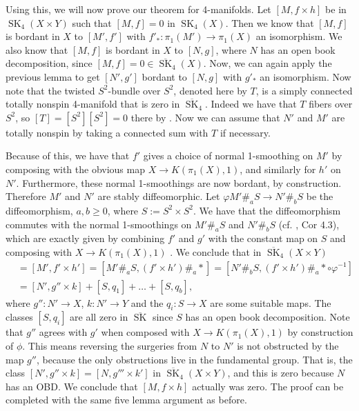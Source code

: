 \documentclass{amsart}
\theoremstyle{definition}
\theoremstyle{remark}
\newcommand{\SK}{\operatorname{SK}}
\newcommand{\bSK}{\overline{\SK}}
\begin{document}
Using this, we will now prove our theorem for 4-manifolds. Let $[M,f\times h]$ be in $\SK_4(X\times Y)$ such that $[M,f] = 0$ in $\SK_4(X)$. Then we know that $[M,f]$ is bordant in $X$ to $[M',f']$ with $f'_*:\pi_1(M')\to\pi_1(X)$ an isomorphism. We also know that $[M,f]$ is bordant in $X$ to $[N,g]$, where $N$ has an open book decomposition, since $[M,f]=0\in\bSK_4(X)$. Now, we can again apply the previous lemma to get $[N',g']$ bordant to $[N,g]$ with $g'_*$ an isomorphism. Now note that the twisted $S^2$-bundle over $S^2$, denoted here by $T$, is a simply connected totally nonspin 4-manifold that is zero in $\bSK_4$. Indeed we have that $T$ fibers over $S^2$, so $[T] = [S^2][S^2] = 0$ there by \cite[Lemma 1.5]{skbook}. Now we can assume that $N'$ and $M'$ are totally nonspin by taking a connected sum with $T$ if necessary.

Because of this, we have that $f'$ gives a choice of normal 1-smoothing on $M'$ by composing with the obvious map $X\to K(\pi_1(X),1)$, and similarly for $h'$ on $N'$. Furthermore, these normal 1-smoothings are now bordant, by construction. Therefore $M'$ and $N'$ are stably diffeomorphic. Let $\varphi M'\#_a S \to N'\#_b S$ be the diffeomorphism, $a,b\geq 0$, where $S:=S^2\times S^2$. We have that the diffeomorphism commutes with the normal 1-smoothings on $M'\#_a S$ and $N'\#_b S$ (cf. \cite{kreck1999surgery}, Cor 4.3), which are exactly given by combining $f'$ and $g'$ with the constant map on $S$ and composing with $X\to K(\pi_1(X),1)$ . We conclude that in $\bSK_4(X\times Y)$
\begin{align*}
    [M,f\times h] &= [M',f'\times h'] = [M'\#_a S, (f'\times h')\#_a *] = [N'\#_b S, (f'\times h')\#_a *\circ \varphi^{-1}] \\
    &= [N', g''\times k] + [S,q_1] + \dots + [S,q_b],
\end{align*}
where $g'':N'\to X$, $k:N'\to Y$ and the $q_i:S\to X$ are some suitable maps. The classes $[S,q_i]$ are all zero in $\bSK$ since $S$ has an open book decomposition. Note that $g''$ agrees with $g'$ when composed with $X\to K(\pi_1(X),1)$ by construction of $\phi$. This means reversing the surgeries from $N$ to $N'$ is not obstructed by the map $g''$, because the only obstructions live in the fundamental group. That is, the class $[N',g''\times k] = [N,g'''\times k']$ in $\bSK_4(X\times Y)$, and this is zero because $N$ has an OBD. We conclude that $[M,f\times h]$ actually was zero. The proof can be completed with the same five lemma argument as before.



\end{document}
